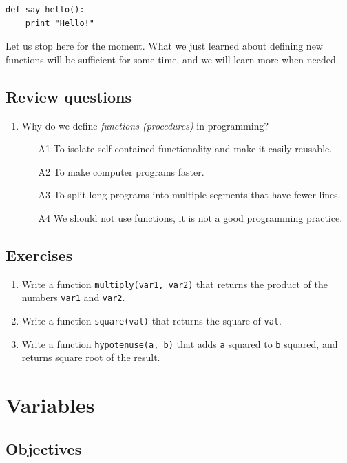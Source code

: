 \begin{verbatim}
def say_hello():
    print "Hello!"
\end{verbatim}
Let us stop here for the moment. What we just learned about defining new functions will be 
sufficient for some time, and we will learn more when needed.

\subsection{Review questions}

\begin{enumerate}
\item Why do we define {\em functions (procedures)} in programming? 
\begin{enumerate}
\item[A1] To isolate self-contained functionality and make it easily reusable.
\item[A2] To make computer programs faster.
\item[A3] To split long programs into multiple segments that have fewer lines.
\item[A4] We should not use functions, it is not a good programming practice.
\end{enumerate}
\end{enumerate}

\subsection{Exercises}

\begin{enumerate}
\item Write a function {\tt multiply(var1, var2)} that returns the product of the 
      numbers {\tt var1} and {\tt var2}.
\item Write a function {\tt square(val)} that returns the square of {\tt val}.
\item Write a function {\tt hypotenuse(a, b)} that adds {\tt a} squared to {\tt b} squared,
      and returns square root of the result.
\end{enumerate}

\section{Variables}

\subsection{Objectives}

